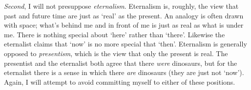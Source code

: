 \documentclass[11pt]{article}
\begin{document}
\begin{spacing}{1.5}
{\em Second}, I will not presuppose {\em eternalism}.  Eternalism is,
roughly, the view that past and future time are just as `real' as the
present.  An analogy is often drawn with space; what's behind me and
in front of me is just as real as what is under me.  There is nothing
special about `here' rather than `there'.  Likewise the eternalist
claims that `now' is no more special that `then'.  Eternalism is
generally opposed to {\em presentism}, which is the view that only the
present is real.  The presentist and the eternalist both agree that
there {\em were} dinosaurs, but for the eternalist there is a sense in
which there {\em are} dinosaurs (they are just not `now').  Again, I
will attempt to avoid committing myself to either of these positions.

\ifstandalone
\end{spacing}


\fi
\end{document}
